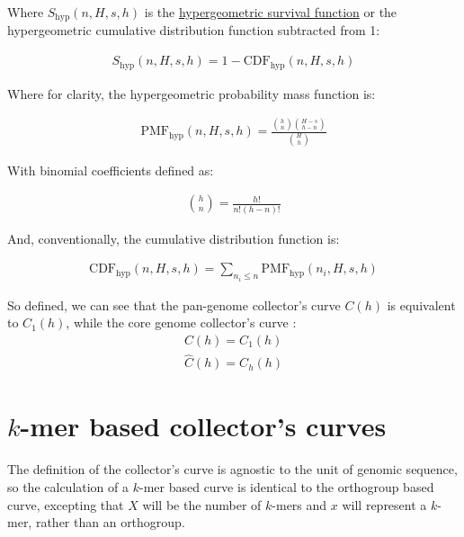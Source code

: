 \documentclass[12pt]{scrartcl}
\begin{document}
Where $S_\text{hyp}(n, H, s, h)$ is the \href{https://docs.scipy.org/doc/scipy/reference/generated/scipy.stats.hypergeom.html}{hypergeometric survival function} or the hypergeometric cumulative distribution function subtracted from 1:

\begin{align}
    S_\text{hyp}(n, H, s, h) = 1 - \text{CDF}_\text{hyp}(n, H, s, h)
\end{align}

Where for clarity, the hypergeometric probability mass function is:

\begin{align}
    \text{PMF}_\text{hyp}(n, H, s, h) = \frac{\binom{h}{n}\binom{H-s}{h-n}}{\binom{H}{h}}
\end{align}

With binomial coefficients defined as:

\begin{align}
    \binom{h}{n} = \frac{h!}{n!(h-n)!}
\end{align}

And, conventionally, the cumulative distribution function is:

\begin{align}
    \text{CDF}_\text{hyp}(n, H, s, h) = \sum_{n_i \leq n} \text{PMF}_\text{hyp}(n_i, H, s, h)
\end{align}

So defined, we can see that the pan-genome collector's curve $C(h)$ is equivalent to $C_1(h)$, while the core genome collector's curve :
\begin{align}
    C(h) = C_1(h) \\
    \hat{C}(h) = C_h(h)
\end{align}

\section*{$k$-mer based collector's curves}

The definition of the collector's curve is agnostic to the unit of genomic sequence, so the calculation of a $k$-mer based curve is identical to the orthogroup based curve, excepting that $X$ will be the number of $k$-mers and $x$ will represent a $k$-mer, rather than an orthogroup.
\end{document}
